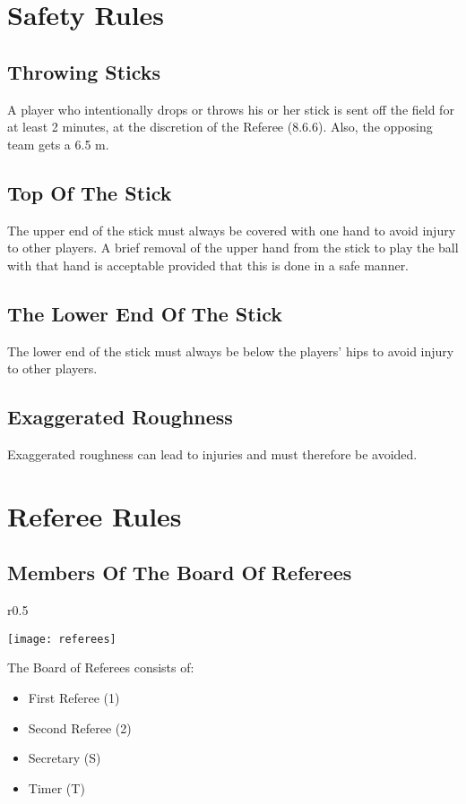 \section{Safety Rules}

\subsection{Throwing Sticks}
A player who intentionally drops or throws his or her stick is sent off the field for at least 2 minutes, at the discretion of
the Referee (8.6.6). Also, the opposing team gets a 6.5 m.

\subsection{Top Of The Stick}
The upper end of the stick must always be covered with one hand to avoid injury to other players. A brief removal of
the upper hand from the stick to play the ball with that hand is acceptable provided that this is done in a safe manner.

\subsection{The Lower End Of The Stick}
The lower end of the stick must always be below the players’ hips to avoid injury to other players.

\subsection{Exaggerated Roughness}
Exaggerated roughness can lead to injuries and must therefore be avoided.

\section{Referee Rules}

 \subsection{Members Of The Board Of Referees}
\begin{wrapfigure}{r}{0.5\textwidth}
  \begin{center}
    \texttt{[image: referees]}
  \end{center}
\end{wrapfigure}
 The Board of Referees consists of:
\begin{itemize}
\item First Referee (1) 
\item Second Referee (2)
\item Secretary (S)
\item Timer (T)
\end{itemize} 

